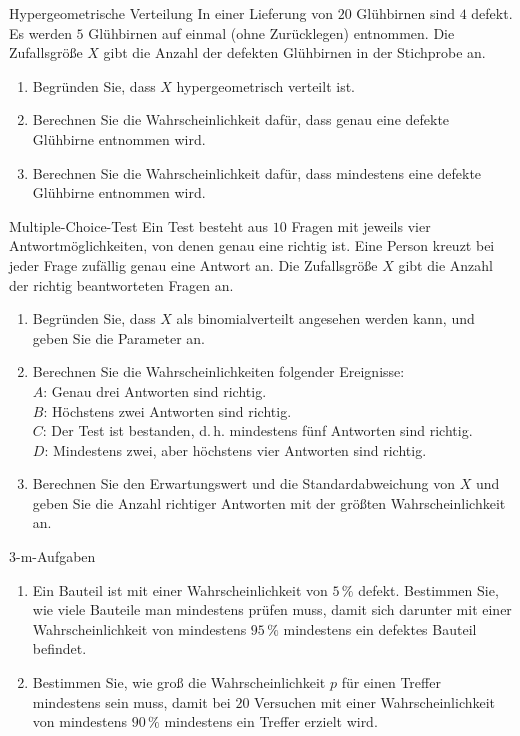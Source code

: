 \begin{uebung}{Hypergeometrische Verteilung}
In einer Lieferung von $20$ Glühbirnen sind $4$ defekt. Es werden $5$ Glühbirnen auf einmal (ohne Zurücklegen) entnommen. Die Zufallsgröße $X$ gibt die Anzahl der defekten Glühbirnen in der Stichprobe an.
\begin{enumerate}[label=\alph*)]
  \item Begründen Sie, dass $X$ hypergeometrisch verteilt ist.
  \item Berechnen Sie die Wahrscheinlichkeit dafür, dass genau eine defekte Glühbirne entnommen wird.
  \item Berechnen Sie die Wahrscheinlichkeit dafür, dass mindestens eine defekte Glühbirne entnommen wird.
\end{enumerate}
\end{uebung}


\begin{uebung}{Multiple-Choice-Test}
Ein Test besteht aus $10$ Fragen mit jeweils vier Antwortmöglichkeiten, von denen genau eine richtig ist. Eine Person kreuzt bei jeder Frage zufällig genau eine Antwort an. Die Zufallsgröße $X$ gibt die Anzahl der richtig beantworteten Fragen an.
\begin{enumerate}[label=\alph*)]
  \item Begründen Sie, dass $X$ als binomialverteilt angesehen werden kann, und geben Sie die Parameter an.
  \item Berechnen Sie die Wahrscheinlichkeiten folgender Ereignisse:\\
  $A$: \glqq Genau drei Antworten sind richtig.\grqq\\
  $B$: \glqq Höchstens zwei Antworten sind richtig.\grqq\\
  $C$: \glqq Der Test ist bestanden, d.\,h. mindestens fünf Antworten sind richtig.\grqq\\
  $D$: \glqq Mindestens zwei, aber höchstens vier Antworten sind richtig.\grqq
  \item Berechnen Sie den Erwartungswert und die Standardabweichung von $X$ und geben Sie die Anzahl richtiger Antworten mit der größten Wahrscheinlichkeit an.
\end{enumerate}
\end{uebung}

\begin{uebung}{3-m-Aufgaben}
\begin{enumerate}[label=\alph*)]
  \item Ein Bauteil ist mit einer Wahrscheinlichkeit von $5\,\%$ defekt. Bestimmen Sie, wie viele Bauteile man mindestens prüfen muss, damit sich darunter mit einer Wahrscheinlichkeit von mindestens $95\,\%$ mindestens ein defektes Bauteil befindet.
  \item Bestimmen Sie, wie groß die Wahrscheinlichkeit $p$ für einen Treffer mindestens sein muss, damit bei $20$ Versuchen mit einer Wahrscheinlichkeit von mindestens $90\,\%$ mindestens ein Treffer erzielt wird.
\end{enumerate}
\end{uebung}

